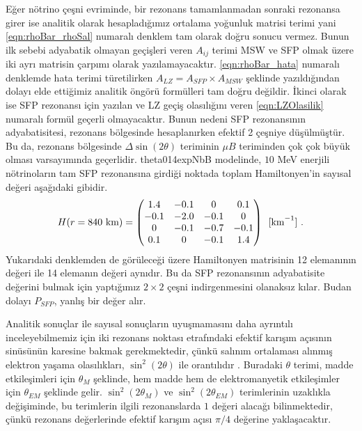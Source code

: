 Eğer nötrino çeşni evriminde, bir rezonans tamamlanmadan sonraki rezonansa girer ise analitik olarak hesapladığımız ortalama yoğunluk matrisi terimi yani \eqref{eqn:rhoBar_rhoSal} numaralı denklem tam olarak doğru sonucu vermez. Bunun ilk sebebi adyabatik olmayan geçişleri veren $ A_{ij} $ terimi MSW ve SFP olmak üzere iki ayrı matrisin çarpımı olarak yazılamayacaktır. \eqref{eqn:rhoBar_hata} numaralı denklemde hata terimi türetilirken $ A_{LZ} = A_{SFP} \times A_{MSW} $ şeklinde yazıldığından dolayı elde ettiğimiz analitik öngörü formülleri tam doğru değildir. İkinci olarak ise SFP rezonansı için yazılan ve LZ geçiş olasılığını veren \eqref{eqn:LZOlasilik} numaralı formül geçerli olmayacaktır. Bunun nedeni SFP rezonansının adyabatisitesi, rezonans bölgesinde hesaplanırken efektif 2 çeşniye düşülmüştür. Bu da, rezonans bölgesinde $ \Delta \sin(2\theta) $ teriminin $ \mu B $ teriminden çok çok büyük olması varsayımında geçerlidir. theta014expNbB modelinde, $ 10 $ MeV enerjili nötrinoların tam SFP rezonansına girdiği noktada toplam Hamiltonyen'in sayısal değeri aşağıdaki gibidir. 
\begin{equation}
    H(r=840 \text{ km}) = \mqty(1.4 & -0.1 & 0 & 0.1\\ -0.1 & -2.0 & -0.1 & 0\\ 0 & -0.1 & -0.7 & -0.1\\ 0.1 & 0 & -0.1 & 1.4) ~~\text{[km}^{-1}\text{]} \text{ .}
\end{equation}
Yukarıdaki denklemden de görüleceği üzere Hamiltonyen matrisinin 12 elemanının değeri ile 14 elemanın değeri aynıdır. Bu da SFP rezonansının adyabatisite değerini bulmak için yaptığımız $ 2\times2 $ çeşni indirgenmesini olanaksız kılar. Budan dolayı $ P_{SFP} $, yanlış bir değer alır.

Analitik sonuçlar ile sayısal sonuçların uyuşmamasını daha ayrıntılı inceleyebilmemiz için iki rezonans noktası etrafındaki efektif karışım açısının sinüsünün karesine bakmak gerekmektedir, çünkü salınım ortalaması alınmış elektron yaşama olasılıkları, $ \sin^{2}(2\theta) $ ile orantılıdır \cite{Kuo:1989qe}. Buradaki $\theta $ terimi, madde etkileşimleri için $ \theta_{M} $ şeklinde, hem madde hem de elektromanyetik etkileşimler için $ \theta_{EM} $ şeklinde gelir. $ \sin^{2}(2\theta_{M}) $ ve $ \sin^{2}(2\theta_{EM}) $ terimlerinin uzaklıkla değişiminde, bu terimlerin ilgili rezonanslarda $ 1 $ değeri alacağı bilinmektedir, çünkü rezonans değerlerinde efektif karışım açısı $ \pi/4 $ değerine yaklaşacaktır. 


